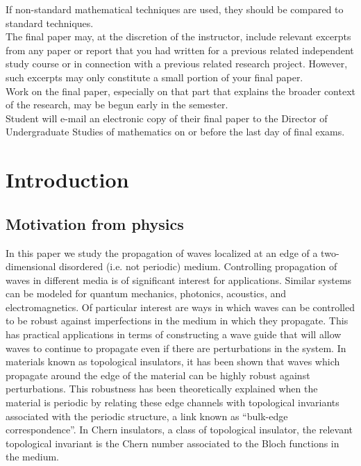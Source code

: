 \documentclass[a4paper]{article}
\begin{document}
If non-standard mathematical techniques are used, they should be compared to standard techniques. \\

The final paper may, at the discretion of the instructor, include relevant excerpts from any paper or report that you had written for a previous related independent study course or in connection with a previous related research project. However, such excerpts may only constitute a small portion of your final paper. \\

Work on the final paper, especially on that part that explains the broader context of the research, may be begun early in the semester. \\

Student will e-mail an electronic copy of their final paper to the Director of Undergraduate Studies of mathematics on or before the last day of final exams. \\

\newpage

\maketitle

\section{Introduction}

\subsection{Motivation from physics}

In this paper we study the propagation of waves localized at an edge of a two-dimensional disordered (i.e. not periodic) medium. Controlling propagation of waves in different media is of significant interest for applications. Similar systems can be modeled for quantum mechanics, photonics, acoustics, and electromagnetics. Of particular interest are ways in which waves can be controlled to be robust against imperfections in the medium in which they propagate. This has practical applications in terms of constructing a wave guide that will allow waves to continue to propagate even if there are perturbations in the system. In materials known as topological insulators, it has been shown that waves which propagate around the edge of the material can be highly robust against perturbations. This robustness has been theoretically explained when the material is periodic by relating these edge channels with topological invariants associated with the periodic structure, a link known as ``bulk-edge correspondence''. In Chern insulators, a class of topological insulator, the relevant topological invariant is the Chern number associated to the Bloch functions in the medium.
\end{document}
